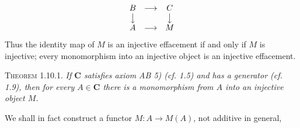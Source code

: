 \[
\begin{array}{ccc}
B & \longrightarrow & C \\
\big\downarrow && \big\downarrow \\
A & \longrightarrow & M
\end{array}
\]
Thus the identity map of $M$ is an injective effacement if and only if $M$ is
injective; every monomorphism into an injective object is an injective
effacement.

\textsc{Theorem 1.10.1.} \textit{If $\mathbf{C}$ satisfies axiom \textup{AB 5)}
\textup{(}\textit{cf.} \textup{1.5)} and has a generator \textup{(}\textit{cf.} \textup{1.9)}, then for every $A\in \mathbf{C}$ there is a
monomorphism from $A$ into an injective object $M$.}

We shall in fact construct a functor
$M:A\to M(A)$, not additive in general,


